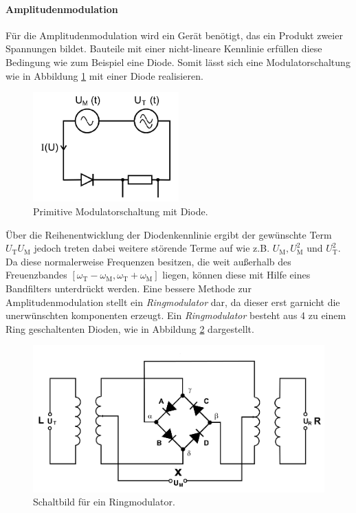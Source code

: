 \paragraph{Amplitudenmodulation}
Für die Amplitudenmodulation
wird ein Gerät benötigt, das ein
Produkt zweier Spannungen bildet.
Bauteile mit einer nicht-lineare Kennlinie
erfüllen diese Bedingung wie zum Beispiel eine
Diode.
Somit lässt sich eine Modulatorschaltung
wie in Abbildung \ref{fig:diode}
mit einer Diode realisieren.
\begin{figure}
  \centering
  \includegraphics[width=0.5\textwidth]{figures/diode.PNG}
  \caption{Primitive Modulatorschaltung mit Diode.}
  \label{fig:diode}
\end{figure}
Über die Reihenentwicklung der
Diodenkennlinie ergibt der gewünschte
Term $U_{\text{T}}U_{\text{M}}$ jedoch
treten dabei weitere störende Terme
auf wie z.B. $U_{\text{M}}, U_{\text{M}}^2$ und $U_{\text{T}}^2$.
Da diese normalerweise Frequenzen
besitzen, die weit außerhalb des
Freuenzbandes $[\omega_{\text{T}}-\omega_{\text{M}},\omega_{\text{T}}+\omega_{\text{M}}]$ liegen,
können diese mit Hilfe eines Bandfilters unterdrückt werden.
Eine bessere Methode zur  Amplitudenmodulation
stellt ein
\textit{Ringmodulator} dar, da dieser
erst garnicht die unerwünschten komponenten
erzeugt.
Ein \textit{Ringmodulator} besteht aus
4 zu einem Ring geschaltenten Dioden,
wie in Abbildung
\ref{fig:Ringmodulator} dargestellt.


\begin{figure}
  \centering
  \includegraphics{figures/Ringmodulator.PNG}
  \caption{Schaltbild für ein Ringmodulator.}
  \label{fig:Ringmodulator}
\end{figure}


